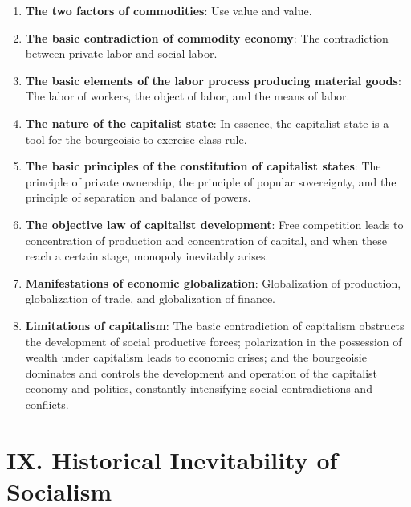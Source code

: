 \documentclass[12pt,a4paper]{ctexart}
\begin{document}
\begin{enumerate}[leftmargin=2em]
    \item \textbf{The two factors of commodities}: Use value and value.
    
    \item \textbf{The basic contradiction of commodity economy}: The contradiction between private labor and social labor.
    
    \item \textbf{The basic elements of the labor process producing material goods}: The labor of workers, the object of labor, and the means of labor.
    
    \item \textbf{The nature of the capitalist state}: In essence, the capitalist state is a tool for the bourgeoisie to exercise class rule.
    
    \item \textbf{The basic principles of the constitution of capitalist states}: The principle of private ownership, the principle of popular sovereignty, and the principle of separation and balance of powers.
    
    \item \textbf{The objective law of capitalist development}: Free competition leads to concentration of production and concentration of capital, and when these reach a certain stage, monopoly inevitably arises.
    
    \item \textbf{Manifestations of economic globalization}: Globalization of production, globalization of trade, and globalization of finance.
    
    \item \textbf{Limitations of capitalism}: The basic contradiction of capitalism obstructs the development of social productive forces; polarization in the possession of wealth under capitalism leads to economic crises; and the bourgeoisie dominates and controls the development and operation of the capitalist economy and politics, constantly intensifying social contradictions and conflicts.
\end{enumerate}

\section{IX. Historical Inevitability of Socialism}
\end{document}
